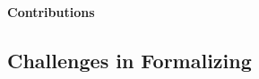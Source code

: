 
\paragraph{Contributions}





\subsection{Challenges in Formalizing \ISA}
\label{sec:challenges-in-formalizing-x86}

